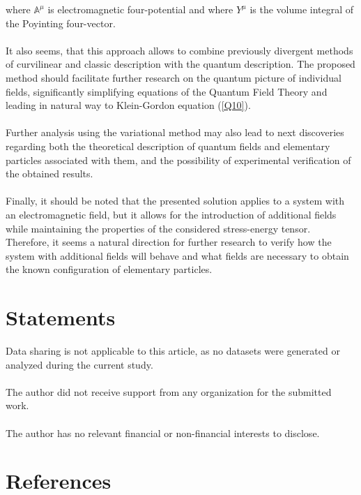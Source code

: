 \documentclass[aps,prx,preprint,groupedaddress,showkeys]{revtex4-2}
\begin{document}
where $\mathbb{A}^{\mu}$ is electromagnetic four-potential and where $Y^{\mu}$ is the volume integral of the Poyinting four-vector. \\
~\\
It also seems, that this approach allows to combine previously divergent methods of curvilinear and classic description with the quantum description. The proposed method should facilitate further research on the quantum picture of individual fields, significantly simplifying equations of the Quantum Field Theory and leading in natural way to Klein-Gordon equation (\ref{Q10}).\\
~\\
Further analysis using the variational method may also lead to next discoveries regarding both the theoretical description of quantum fields and elementary particles associated with them, and the possibility of experimental verification of the obtained results.\\
~\\
Finally, it should be noted that the presented solution applies to a system with an electromagnetic field, but it allows for the introduction of additional fields while maintaining the properties of the considered stress-energy tensor. Therefore, it seems a natural direction for further research to verify how the system with additional fields will behave and what fields are necessary to obtain the known configuration of elementary particles.

\section{Statements} \label{4Chap}

Data sharing is not applicable to this article, as no datasets were generated or analyzed during the current study.\\
~\\
The author did not receive support from any organization for the submitted work.\\
~\\
The author has no relevant financial or non-financial interests to disclose.\\


\section*{References}


\end{document}
